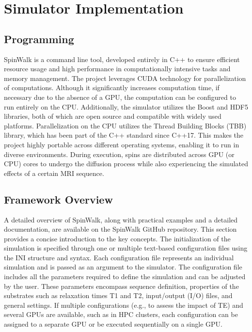 \section{Simulator Implementation}

\subsection*{Programming}
SpinWalk is a command line tool, developed entirely in C++ to ensure efficient resource usage and high performance in computationally intensive tasks and memory management. The project leverages CUDA technology for parallelization of computations. Although it significantly increases computation time, if necessary due to the absence of a GPU, the computation can be configured to run entirely on the CPU. Additionally, the simulator utilizes the Boost and HDF5 libraries, both of which are open source and compatible with widely used platforms. Parallelization on the CPU utilizes the Thread Building Blocks (TBB) library, which has been part of the C++ standard since C++17. This makes the project highly portable across different operating systems, enabling it to run in diverse environments. During execution, spins are distributed across GPU (or CPU) cores to undergo the diffusion process while also experiencing the simulated effects of a certain MRI sequence.


\subsection*{Framework Overview}
A detailed overview of SpinWalk, along with practical examples and a detailed documentation, are available on the SpinWalk GitHub repository. This section provides a concise introduction to the key concepts. The initialization of the simulation is specified through one or multiple text-based configuration files using the INI structure and syntax. Each configuration file represents an individual simulation and is passed as an argument to the simulator. The configuration file includes all the parameters required to define the simulation and can be adjusted by the user. These parameters encompass sequence definition, properties of the substrates such as relaxation times T1 and T2, input/output (I/O) files, and general settings. If multiple configurations (e.g., to assess the impact of TE) and several GPUs are available, such as in HPC clusters, each configuration can be assigned to a separate GPU or be executed sequentially on a single GPU.

